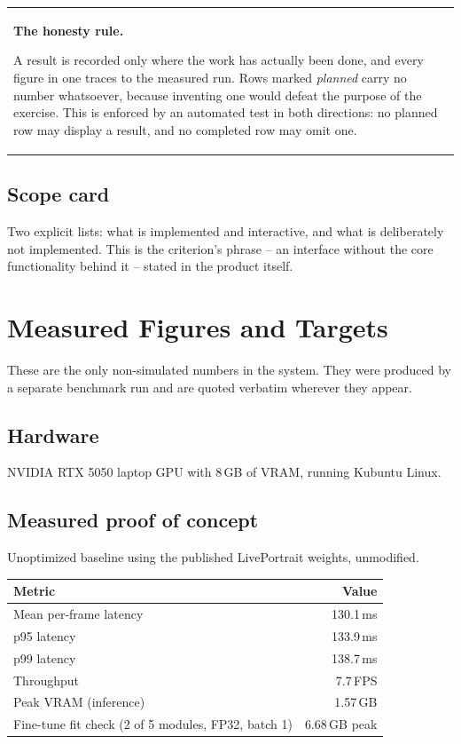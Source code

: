 \documentclass[11pt,a4paper]{report}
\newenvironment{npnote}[1]
  {\par\medskip\noindent\begin{tabularx}{\linewidth}{|>{\hspace{4pt}}X<{\hspace{4pt}}|}
   \hline\rule{0pt}{3ex}\textbf{#1}\par\medskip}
  {\par\medskip\hline\end{tabularx}\par\medskip}
\begin{document}
\begin{npnote}{The honesty rule.}
A result is recorded only where the work has actually been done, and every
figure in one traces to the measured run. Rows marked \emph{planned} carry no
number whatsoever, because inventing one would defeat the purpose of the
exercise. This is enforced by an automated test in both directions: no planned
row may display a result, and no completed row may omit one.
\end{npnote}

\section{Scope card}

Two explicit lists: what is implemented and interactive, and what is
deliberately not implemented. This is the criterion's phrase -- an interface
without the core functionality behind it -- stated in the product itself.

\chapter{Measured Figures and Targets}
\label{ch:numbers}

These are the only non-simulated numbers in the system. They were produced by a
separate benchmark run and are quoted verbatim wherever they appear.

\section{Hardware}

NVIDIA RTX 5050 laptop GPU with 8\,GB of VRAM, running Kubuntu Linux.

\section{Measured proof of concept}

Unoptimized baseline using the published LivePortrait weights, unmodified.

\begin{center}
\begin{tabular}{lr}
\toprule
\textbf{Metric} & \textbf{Value} \\
\midrule
Mean per-frame latency & 130.1\,ms \\
p95 latency & 133.9\,ms \\
p99 latency & 138.7\,ms \\
Throughput & 7.7\,FPS \\
Peak VRAM (inference) & 1.57\,GB \\
Fine-tune fit check (2 of 5 modules, FP32, batch 1) & 6.68\,GB peak \\
\bottomrule
\end{tabular}
\end{center}
\end{document}
